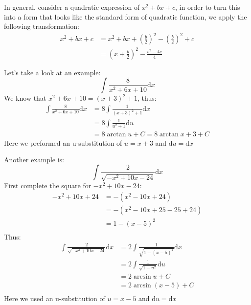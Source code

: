 \documentclass{article}
\numberwithin{equation}{section}
\begin{document}
In general, consider a quadratic expression of $x^2 + bx + c$, in order to turn this into a form
that looks like the standard form of quadratic function, we apply the following transformation:
\begin{align*}
    x^2 + bx + c &= x^2 + bx + \left(\frac{b}{2}\right)^2 - \left(\frac{b}{2}\right)^2 + c\\
    &= \left(x+ \frac{b}{2}\right)^2 - \frac{b^2-4c}{4}
\end{align*}

\newpage
Let's take a look at an example:
\[
\int \frac{8}{x^2 + 6x + 10}\mathrm{d}x
\]
We know that $x^2 + 6x + 10 = (x+3)^2 +1$, thus:
\begin{align*}
    \int \frac{8}{x^2 + 6x + 10}\mathrm{d}x &= 8\int \frac{1}{(x+3)^2 + 1}\mathrm{d}x\\
    &= 8 \int \frac{1}{u^2 + 1}\mathrm{d}u\\
    &= 8\arctan{u}+C = 8 \arctan{x+3}+C
\end{align*}
Here we preformed an u-substitution of $u = x+3$ and $\mathrm{d}u = \mathrm{d}x$ 

Another example is:
\[
\int \frac{2}{\sqrt{-x^2 + 10x - 24}}\mathrm{d}x
\]
First complete the square for $-x^2 + 10 x -24$:
\begin{align*}
    -x^2 + 10x + 24 &= -(x^2 - 10x + 24)\\
    &= - (x^2 - 10x + 25 -25 + 24)\\
    &= 1-(x-5)^2\\
\end{align*}
Thus:
\begin{align*}
    \int \frac{2}{\sqrt{-x^2 + 10x - 24}}\mathrm{d}x &= 2\int \frac{1}{\sqrt{1-(x-5)^2}} \mathrm{d}x\\
    &= 2\int \frac{1}{\sqrt{1-u^2}}\mathrm{d}u\\
    &= 2 \arcsin{u} + C\\
    &= 2\arcsin{(x-5)} +C\\
\end{align*}
Here we used an u-substitution of $u=x-5$ and $\mathrm{d}u = \mathrm{d}x$
\end{document}
